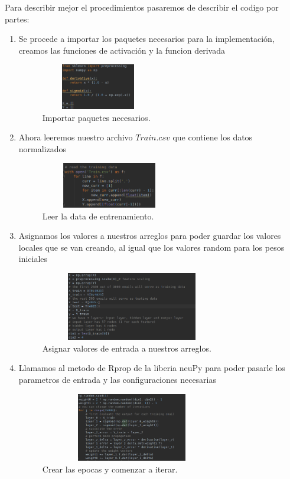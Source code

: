 \documentclass[12pt]{article}
\begin{document}
Para describir mejor el procedimientos pasaremos de describir el codigo por partes:
\begin{enumerate}
\item
Se procede a importar los paquetes necesarios para la implementación, creamos las funciones de activación y la funcion derivada
\newline
\begin{figure}[h]
\includegraphics[width=5cm, height=2cm]{mlp_import}
\centering
\caption{Importar paquetes necesarios.}
\label{fig:RPROP_IMPORT}
\end{figure}

\item
Ahora leeremos nuestro archivo $Train.csv$ que contiene los datos normalizados
 \begin{figure}[h]
\includegraphics[width=6cm, height=2cm]{mlp_read}
\centering
\caption{Leer la data de entrenamiento.}
\label{fig:RPROP_INIT}
\end{figure}

\item
Asignamos los valores a nuestros arreglos para poder guardar los valores locales que se van creando, al igual que los valores random para los pesos iniciales
 \begin{figure}[h]
\includegraphics[width=8cm, height=3cm]{mlp_assign}
\centering
\caption{Asignar valores de entrada a nuestros arreglos.}
\label{fig:RPROP_READ}
\end{figure}

\item
Llamamos al metodo de Rprop de la liberia neuPy para poder pasarle los parametros de entrada y las configuraciones necesarias
\begin{figure}[h]
\includegraphics[width=8cm, height=3cm]{mlp_train}
\centering
\caption{Crear las epocas y comenzar a iterar.}
\label{fig:RPROP_READ}
\end{figure}


\end{enumerate}
\end{document}
